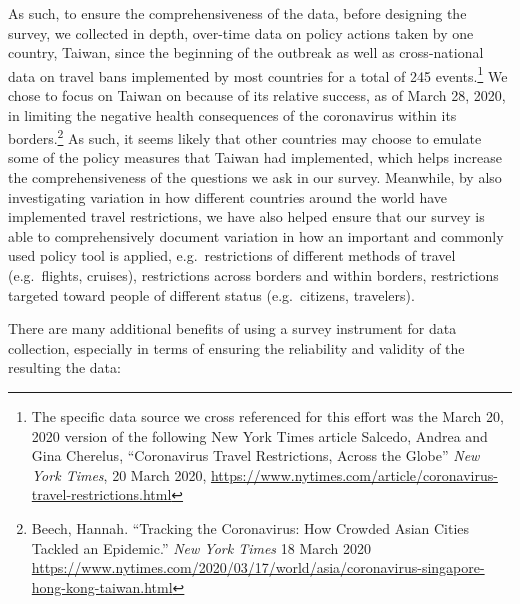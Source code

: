 \documentclass[]{article}
\let\rmarkdownfootnote\footnote%
\def\footnote{\protect\rmarkdownfootnote}
\begin{document}
As such, to ensure the comprehensiveness of the data, before designing the survey, we collected in depth, over-time data on policy actions taken by one country, Taiwan, since the beginning of the outbreak as well as cross-national data on travel bans implemented by most countries for a total of 245 events.\footnote{The specific data source we cross referenced for this effort was the March 20, 2020 version of the following New York Times article Salcedo, Andrea and Gina Cherelus, ``Coronavirus Travel Restrictions, Across the Globe'' \emph{New York Times}, 20 March 2020, \url{https://www.nytimes.com/article/coronavirus-travel-restrictions.html}} We chose to focus on Taiwan on because of its relative success, as of March 28, 2020, in limiting the negative health consequences of the coronavirus within its borders.\footnote{Beech, Hannah. ``Tracking the Coronavirus: How Crowded Asian Cities Tackled an Epidemic.'' \emph{New York Times} 18 March 2020 \url{https://www.nytimes.com/2020/03/17/world/asia/coronavirus-singapore-hong-kong-taiwan.html}} As such, it seems likely that other countries may choose to emulate some of the policy measures that Taiwan had implemented, which helps increase the comprehensiveness of the questions we ask in our survey. Meanwhile, by also investigating variation in how different countries around the world have implemented travel restrictions, we have also helped ensure that our survey is able to comprehensively document variation in how an important and commonly used policy tool is applied, e.g.~restrictions of different methods of travel (e.g.~flights, cruises), restrictions across borders and within borders, restrictions targeted toward people of different status (e.g.~citizens, travelers).

There are many additional benefits of using a survey instrument for data collection, especially in terms of ensuring the reliability and validity of the resulting the data:
\end{document}
